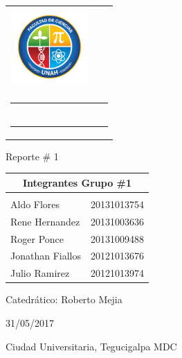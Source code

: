 \begin{titlepage}
\begin{tabular}{l c l}
	\begin{minipage}{3cm}
    	\includegraphics[width=3cm, height = 3cm]{figures/miscelanea/CIENCIAS_logo.jpg}
	\end{minipage}\\

  \multicolumn{3}{c}{\rule{150mm}{0.1mm}}\\
  \multicolumn{3}{c}{\rule[2mm]{150mm}{0.8mm}}\\
    
  \end{tabular}    
  
  \vspace{1 cm}
  \begin{center}
    {\large
      Reporte \# 1%
    }
  \end{center}
  \vspace{1 cm}
  
	
	\begin{tabular}{l c}
	\multicolumn{2}{c}{\Large \textbf{Integrantes Grupo \#1}}\\
	\hline \\
	Aldo Flores & 20131013754\\
	Rene Hernandez & 20131003636\\
	Roger Ponce & 20131009488\\
	Jonathan Fiallos & 20121013676\\
	Julio Ramirez & 20121013974
	
	\end{tabular}	  
  
  \begin{center}
    {\large
      Catedrático: Roberto Mejia
    }
  \end{center}
  \vspace{3 cm}
  \begin{center}
    {\large
      31/05/2017
    }
  \end{center}
  \begin{center}
    {\large
      Ciudad Universitaria, Tegucigalpa MDC
    }
  \end{center}
  
\end{titlepage}
\clearpage
